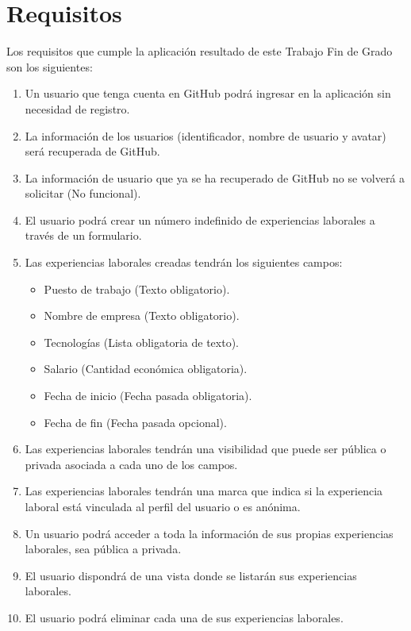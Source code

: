 \documentclass[a4paper, 12pt]{book}
\begin{document}
    \section{Requisitos}
    \label{sec:target_requirements}

    Los requisitos que cumple la aplicación resultado de este Trabajo Fin de Grado son los siguientes:

    \begin{enumerate}
        \item Un usuario que tenga cuenta en GitHub podrá ingresar en la aplicación sin necesidad de registro.
        \item La información de los usuarios (identificador, nombre de usuario y avatar) será recuperada de GitHub.
        \item La información de usuario que ya se ha recuperado de GitHub no se volverá a solicitar (No funcional).
        \item El usuario podrá crear un número indefinido de experiencias laborales a través de un formulario.
        \item Las experiencias laborales creadas tendrán los siguientes campos:
        \begin{itemize}
            \item Puesto de trabajo (Texto obligatorio).
            \item Nombre de empresa (Texto obligatorio).
            \item Tecnologías (Lista obligatoria de texto).
            \item Salario (Cantidad económica obligatoria).
            \item Fecha de inicio (Fecha pasada obligatoria).
            \item Fecha de fin (Fecha pasada opcional).
        \end{itemize}
        \item Las experiencias laborales tendrán una visibilidad que puede ser pública o privada asociada a cada uno de los campos.
        \item Las experiencias laborales tendrán una marca que indica si la experiencia laboral está vinculada al perfil del usuario o es anónima.
        \item Un usuario podrá acceder a toda la información de sus propias experiencias laborales, sea pública a privada.
        \item El usuario dispondrá de una vista donde se listarán sus experiencias laborales.
        \item El usuario podrá eliminar cada una de sus experiencias laborales.

\end{enumerate}
\end{document}
